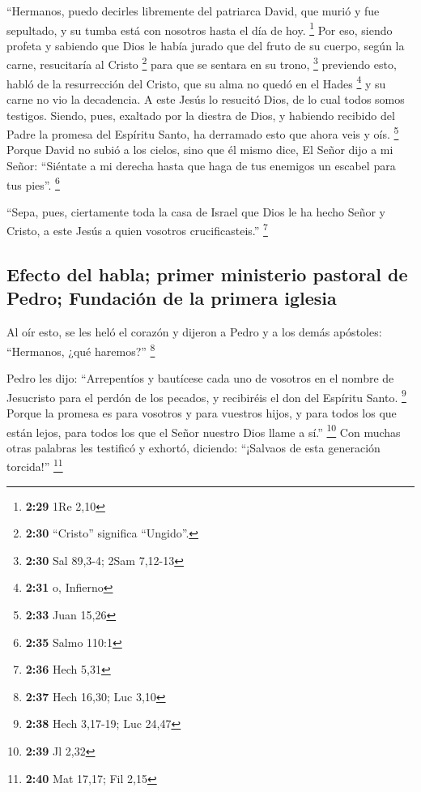 \begin{paracol}{2}
 ``Hermanos, puedo decirles libremente del patriarca
David, que murió y fue sepultado, y su tumba está con nosotros hasta el
día de hoy. \footnote{\textbf{2:29} 1Re 2,10}  Por eso,
siendo profeta y sabiendo que Dios le había jurado que del fruto de su
cuerpo, según la carne, resucitaría al Cristo \footnote{\textbf{2:30}
  ``Cristo'' significa ``Ungido''.} para que se sentara en su trono,
\footnote{\textbf{2:30} Sal 89,3-4; 2Sam 7,12-13} 
previendo esto, habló de la resurrección del Cristo, que su alma no
quedó en el Hades \footnote{\textbf{2:31} o, Infierno} y su carne no vio
la decadencia.  A este Jesús lo resucitó Dios, de lo cual
todos somos testigos.  Siendo, pues, exaltado por la
diestra de Dios, y habiendo recibido del Padre la promesa del Espíritu
Santo, ha derramado esto que ahora veis y oís. \footnote{\textbf{2:33}
  Juan 15,26}  Porque David no subió a los cielos, sino
que él mismo dice, El Señor dijo a mi Señor: ``Siéntate a mi derecha
 hasta que haga de tus enemigos un escabel para tus
pies''. \footnote{\textbf{2:35} Salmo 110:1}

 ``Sepa, pues, ciertamente toda la casa de Israel que
Dios le ha hecho Señor y Cristo, a este Jesús a quien vosotros
crucificasteis.'' \footnote{\textbf{2:36} Hech 5,31}

\hypertarget{efecto-del-habla-primer-ministerio-pastoral-de-pedro-fundaciuxf3n-de-la-primera-iglesia}{%
\subsection{Efecto del habla; primer ministerio pastoral de Pedro;
Fundación de la primera
iglesia}\label{efecto-del-habla-primer-ministerio-pastoral-de-pedro-fundaciuxf3n-de-la-primera-iglesia}}

 Al oír esto, se les heló el corazón y dijeron a Pedro y
a los demás apóstoles: ``Hermanos, ¿qué haremos?'' \footnote{\textbf{2:37}
  Hech 16,30; Luc 3,10}

 Pedro les dijo: ``Arrepentíos y bautícese cada uno de
vosotros en el nombre de Jesucristo para el perdón de los pecados, y
recibiréis el don del Espíritu Santo. \footnote{\textbf{2:38} Hech
  3,17-19; Luc 24,47}  Porque la promesa es para vosotros
y para vuestros hijos, y para todos los que están lejos, para todos los
que el Señor nuestro Dios llame a sí.'' \footnote{\textbf{2:39} Jl 2,32}
 Con muchas otras palabras les testificó y exhortó,
diciendo: ``¡Salvaos de esta generación torcida!'' \footnote{\textbf{2:40}
  Mat 17,17; Fil 2,15}


\end{paracol}
